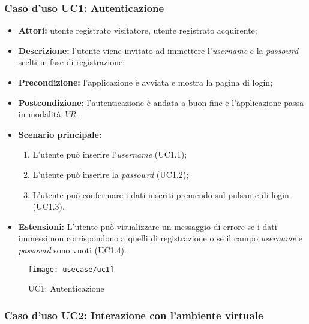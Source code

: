 \subsubsection{Caso d'uso UC1: Autenticazione}

\begin{itemize}
	\item \textbf{Attori:} utente registrato visitatore, utente registrato acquirente;
	\item \textbf{Descrizione:} l'utente viene invitato ad immettere l'\textit{username} e la \textit{passowrd} scelti in fase di registrazione;
	\item \textbf{Precondizione:} l'applicazione è avviata e mostra la pagina di login;
	\item \textbf{Postcondizione:} l'autenticazione è andata a buon fine e l'applicazione passa in modalità \textit{VR}.
	\item \textbf{Scenario principale:}
	\begin{enumerate}
		\item L'utente può inserire l'\textit{username} (UC1.1);
		\item L'utente può inserire la \textit{passowrd} (UC1.2);
		\item L'utente può confermare i dati inseriti premendo sul pulsante di login (UC1.3).
	\end{enumerate}
	\item \textbf{Estensioni:} L'utente può visualizzare un messaggio di errore se i dati immessi non corrispondono a quelli di registrazione o se il campo \textit{username} e \textit{passowrd} sono vuoti (UC1.4).
\end{itemize}

\label{UC1}
\begin{figure}[ht]
	\begin{center}
		\texttt{[image: usecase/uc1]}
		\caption{UC1: Autenticazione}
	\end{center}
\end{figure}
\FloatBarrier

\subsubsection{Caso d'uso UC2: Interazione con l'ambiente virtuale}

